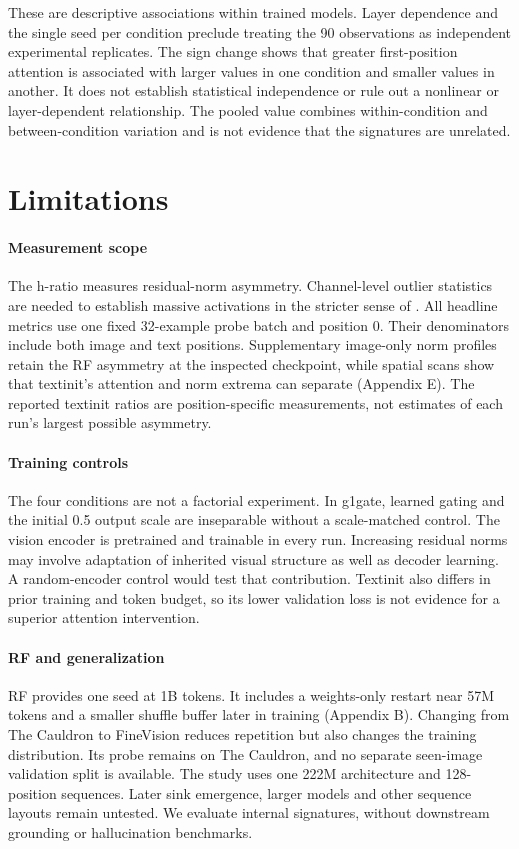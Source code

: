 \documentclass{article}
\begin{document}
These are descriptive associations within trained models. Layer dependence and the single seed per condition preclude treating the 90 observations as independent experimental replicates. The sign change shows that greater first-position attention is associated with larger values in one condition and smaller values in another. It does not establish statistical independence or rule out a nonlinear or layer-dependent relationship. The pooled value combines within-condition and between-condition variation and is not evidence that the signatures are unrelated.

\section{Limitations}

\paragraph{Measurement scope} The h-ratio measures residual-norm asymmetry. Channel-level outlier statistics are needed to establish massive activations in the stricter sense of \cite{ref2,ref5}. All headline metrics use one fixed 32-example probe batch and position 0. Their denominators include both image and text positions. Supplementary image-only norm profiles retain the RF asymmetry at the inspected checkpoint, while spatial scans show that textinit's attention and norm extrema can separate (Appendix E). The reported textinit ratios are position-specific measurements, not estimates of each run's largest possible asymmetry.

\paragraph{Training controls} The four conditions are not a factorial experiment. In g1gate, learned gating and the initial 0.5 output scale are inseparable without a scale-matched control. The vision encoder is pretrained and trainable in every run. Increasing residual norms may involve adaptation of inherited visual structure as well as decoder learning. A random-encoder control would test that contribution. Textinit also differs in prior training and token budget, so its lower validation loss is not evidence for a superior attention intervention.

\paragraph{RF and generalization} RF provides one seed at 1B tokens. It includes a weights-only restart near 57M tokens and a smaller shuffle buffer later in training (Appendix B). Changing from The Cauldron to FineVision reduces repetition but also changes the training distribution. Its probe remains on The Cauldron, and no separate seen-image validation split is available. The study uses one 222M architecture and 128-position sequences. Later sink emergence, larger models and other sequence layouts remain untested. We evaluate internal signatures, without downstream grounding or hallucination benchmarks.
\end{document}
